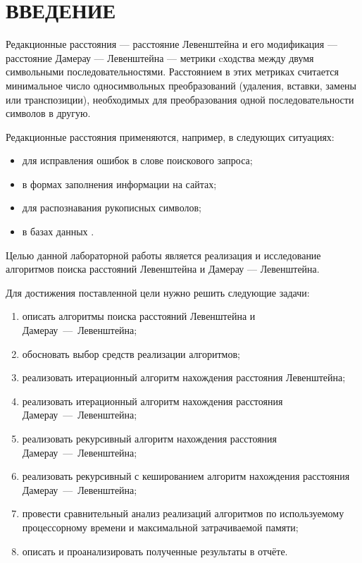 \section*{ВВЕДЕНИЕ}

Редакционные расстояния --- расстояние Левенштейна и его модификация --- расстояние Дамерау --- Левенштейна --- метрики cходства между двумя символьными последовательностями.
Расстоянием в этих метриках считается минимальное число односимвольных преобразований (удаления, вставки, замены или транспозиции), необходимых для преобразования одной последовательности символов в другую.

Редакционные расстояния применяются, например, в следующих ситуациях:
\begin{itemize}
    \item для исправления ошибок в слове поискового запроса;
    \item в формах заполнения информации на сайтах;
    \item для распознавания рукописных символов;
    \item в базах данных \cite{ldla}.
\end{itemize}

Целью данной лабораторной работы является реализация и исследование алгоритмов поиска расстояний Левенштейна и Дамерау --- Левенштейна.

Для достижения поставленной цели нужно решить следующие задачи:
\begin{enumerate}
    \item описать алгоритмы поиска расстояний Левенштейна и Дамерау~---~Левенштейна;
    \item обосновать выбор средств реализации алгоритмов;
    \item реализовать итерационный алгоритм нахождения расстояния Левенштейна;
    \item реализовать итерационный алгоритм нахождения расстояния Дамерау~---~Левенштейна;
    \item реализовать рекурсивный алгоритм нахождения расстояния Дамерау~---~Левенштейна;
    \item реализовать рекурсивный с кешированием алгоритм нахождения расстояния Дамерау~---~Левенштейна;
    \item провести сравнительный анализ реализаций алгоритмов по используемому процессорному времени и максимальной затрачиваемой памяти;
    \item описать и проанализировать полученные результаты в отчёте.
\end{enumerate} %
